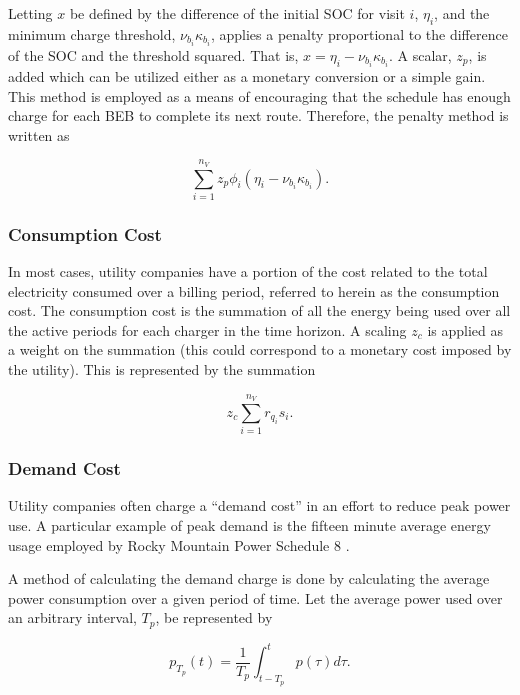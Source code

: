 \documentclass[ee,thesis]{usuthesis}
\begin{document}
Letting \(x\) be defined by the difference of the initial SOC for visit \(i\), \(\eta_i\), and the minimum charge threshold,
\(\nu_{b_i}\kappa_{b_i}\), applies a penalty proportional to the difference of the SOC and the threshold squared. That is, \(x =
\eta_i - \nu_{b_i} \kappa_{b_i}\). A scalar, \(z_p\), is added which can be utilized either as a monetary conversion or a simple
gain. This method is employed as a means of encouraging that the schedule has enough charge for each BEB to complete its
next route. Therefore, the penalty method is written as

\begin{equation}
\label{eq:penalty-method}
\sum_{i=1}^{n_V} z_p \phi_i(\eta_i - \nu_{b_i} \kappa_{b_i})\text{.}
\end{equation}

\subsubsection{Consumption Cost}
\label{sec:sa-consumpction-cost}
In most cases, utility companies have a portion of the cost related to the total electricity consumed over a billing
period, referred to herein as the consumption cost. The consumption cost is the summation of all the energy being used
over all the active periods for each charger in the time horizon. A scaling \(z_c\) is applied as a weight on the
summation (this could correspond to a monetary cost imposed by the utility). This is represented by the summation

\begin{equation}
\label{eq:consumption-cost}
z_c \sum_{i=1}^{n_V} r_{q_i}s_i\text{.}
\end{equation}

\subsubsection{Demand Cost}
\label{sec:sa-demand-cost}
Utility companies often charge a ``demand cost'' in an effort to reduce peak power use. A particular example of peak
demand is the fifteen minute average energy usage employed by Rocky Mountain Power Schedule 8
\cite{rocky-mountain-power}.

A method of calculating the demand charge is done by calculating the average power consumption over a given period of
time. Let the average power used over an arbitrary interval, \(T_p\), be represented by

\begin{equation}
\label{eq:p}
p_{T_p}(t) = \frac{1}{T_p} \int_{t-T_p}^{t} p(\tau) d\tau\text{.}
\end{equation}
\end{document}
